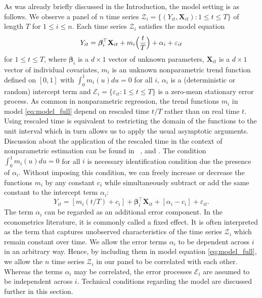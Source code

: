 \documentclass[a4paper,12pt]{article}
\begin{document}
As was already briefly discussed in the Introduction, the model setting is as follows. We observe a panel of $n$ time series $\mathcal{Z}_i = \{(Y_{it}, \mathbf{X}_{it}): 1 \le t \le T \}$ of length $T$ for $1 \le i \le n$. Each time series $\mathcal{Z}_i$ satisfies the model equation 
\begin{equation}\label{eq:model_full}
Y_{it} = \bm{\beta}^\top_i \mathbf{X}_{it} + m_i \Big( \frac{t}{T} \Big) + \alpha_i + \varepsilon_{it} 
\end{equation}
for $1 \le t \le T$, where $\bm{\beta}_i$ is a $d \times 1$ vector of unknown parameters, $\mathbf{X}_{it}$ is a $d\times 1$ vector of individual covariates, $m_i$ is an unknown nonparametric trend function defined on $[0,1]$ with $\int_0^1 m_i(u) du = 0$ for all $i$, $\alpha_i$ is a (deterministic or random) intercept term and $\mathcal{E}_i = \{ \varepsilon_{it}: 1 \le t \le T \}$ is a zero-mean stationary error process. As common in nonparametric regression, the trend functions $m_i$ in model \eqref{eq:model_full} depend on rescaled time $t/T$ rather than on real time $t$. Using rescaled time is equivalent to restricting the domain of the functions to the unit interval which in turn allows us to apply the usual asymptotic arguments. Discussion about the application of the rescaled time in the context of nonparametric estimation can be found in \ \cite{Robinson1989}, \cite{Dahlhaus1997} and \cite{VogtLinton2014}. The condition $\int_0^1 m_i(u) du = 0$ for all $i$ is necessary identification condition due the presence of  $\alpha_i$. Without imposing this condition, we can freely increase or decrease the functions $m_i$ by any constant $c_i$ while simultaneously subtract or add the same constant to the intercept term $\alpha_i$:
$$Y_{it} = [m_i(t/T) + c_i] + \bm{\beta}_i^\top \mathbf{X}_{it} + [\alpha_i - c_i] + \varepsilon_{it}.$$
The term $\alpha_i$ can be regarded as an additional error component. In the econometrics literature, it is commonly called a fixed effect. It is often interpreted as the term that captures unobserved characteristics of the time series $\mathcal{Z}_i$ which remain constant over time. We allow the error terms $\alpha_i$ to be dependent across $i$ in an arbitrary way. Hence, by including them in model equation \eqref{eq:model_full}, we allow the $n$ time series $\mathcal{Z}_i$ in our panel to be correlated with each other. Whereas the terms $\alpha_i$ may be correlated, the error processes $\mathcal{E}_i$ are assumed to be independent across $i$. Technical conditions regarding the model are discussed further in this section.
\end{document}
